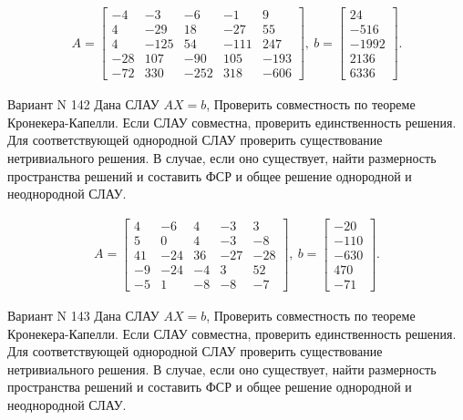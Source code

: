 \documentclass[11pt]{report}
\begin{document}
\begin{align*}
 A = \left[\begin{matrix}-4 & -3 & -6 & -1 & 9\\4 & -29 & 18 & -27 & 55\\4 & -125 & 54 & -111 & 247\\-28 & 107 & -90 & 105 & -193\\-72 & 330 & -252 & 318 & -606\end{matrix}\right],
\ b = \left[\begin{matrix}24\\-516\\-1992\\2136\\6336\end{matrix}\right]. 
 \end{align*}

Вариант N 142
Дана СЛАУ $AX = b$,
Проверить совместность по теореме Кронекера-Капелли. Если СЛАУ совместна, проверить единственность решения.
Для соответствующей однородной СЛАУ проверить существование нетривиального решения. В случае, если оно существует,
найти размерность пространства решений и составить ФСР и общее решение однородной  и неоднородной СЛАУ.


\begin{align*}
 A = \left[\begin{matrix}4 & -6 & 4 & -3 & 3\\5 & 0 & 4 & -3 & -8\\41 & -24 & 36 & -27 & -28\\-9 & -24 & -4 & 3 & 52\\-5 & 1 & -8 & -8 & -7\end{matrix}\right],
\ b = \left[\begin{matrix}-20\\-110\\-630\\470\\-71\end{matrix}\right]. 
 \end{align*}

Вариант N 143
Дана СЛАУ $AX = b$,
Проверить совместность по теореме Кронекера-Капелли. Если СЛАУ совместна, проверить единственность решения.
Для соответствующей однородной СЛАУ проверить существование нетривиального решения. В случае, если оно существует,
найти размерность пространства решений и составить ФСР и общее решение однородной  и неоднородной СЛАУ.
\end{document}
